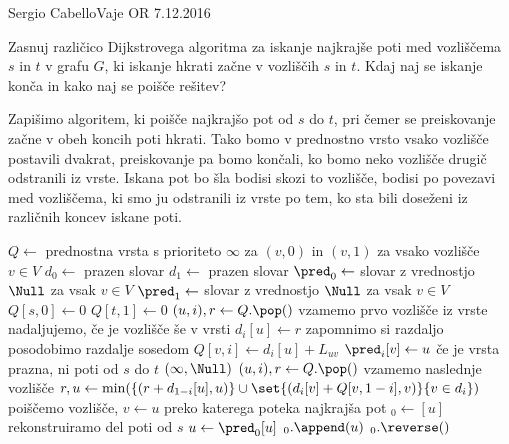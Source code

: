 \begin{naloga}{Sergio Cabello}{Vaje OR 7.12.2016}
\begin{vprasanje}
Zasnuj različico Dijkstrovega algoritma
za iskanje najkrajše poti med vozliščema $s$ in $t$ v grafu $G$,
ki iskanje hkrati začne v vozliščih $s$ in $t$.
Kdaj naj se iskanje konča in kako naj se poišče rešitev?
\end{vprasanje}

\begin{odgovor}
Zapišimo algoritem, ki poišče najkrajšo pot od $s$ do $t$,
pri čemer se preiskovanje začne v obeh koncih poti hkrati.
Tako bomo v prednostno vrsto vsako vozlišče postavili dvakrat,
preiskovanje pa bomo končali,
ko bomo neko vozlišče drugič odstranili iz vrste.
Iskana pot bo šla bodisi skozi to vozlišče,
bodisi po povezavi med vozliščema,
ki smo ju odstranili iz vrste po tem,
ko sta bili doseženi iz različnih koncev iskane poti.
\begin{small}
\begin{algorithmic}
	\State $Q \gets$ prednostna vrsta
        s prioriteto $\infty$ za $(v, 0)$ in $(v, 1)$
        za vsako vozlišče $v \in V$
	\State $d_0 \gets$ prazen slovar
	\State $d_1 \gets$ prazen slovar
    \State $\pred_0 \gets$ slovar z vrednostjo $\Null$ za vsak $v \in V$
	\State $\pred_1 \gets$ slovar z vrednostjo $\Null$ za vsak $v \in V$
	\State $Q[s, 0] \gets 0$
	\State $Q[t, 1] \gets 0$
    \State $(u, i), r \gets Q.\pop()$ \hfill vzamemo prvo vozlišče iz vrste
	 \hfill nadaljujemo, če je vozlišče še v vrsti
        \State $d_i[u] \gets r$ \hfill zapomnimo si razdaljo
		 \hfill posodobimo razdalje sosedom
				\State $Q[v, i] \gets d_i[u] + L_{uv}$
                \State $\pred_i[v] \gets u$
			\EndIf
		\EndFor
         \hfill če je vrsta prazna, ni poti od $s$ do $t$
            \State \Return $(\infty, \Null)$
        \EndIf
        \State $(u, i), r \gets Q.\pop()$ \hfill vzamemo naslednje vozlišče
	\EndWhile
    \State $r, u \gets \min(\{(r + d_{1-i}[u], u)\} \cup
                            \set{(d_i[v] + Q[v, 1-i], v)}{v \in d_i})$
        \hfill poiščemo vozlišče,
    \State $v \gets u$ \hfill preko katerega poteka najkrajša pot
    $_0 \gets [u]$
    \While{$\pred_0[u] \ne \Null$} \hfill rekonstruiramo del poti od $s$
        \State $u \gets \pred_0[u]$
        $_0.\append(u)$
    \EndWhile
    $_0.\reverse()$

\end{algorithmic}
\end{small}
\end{odgovor}
\end{naloga}
